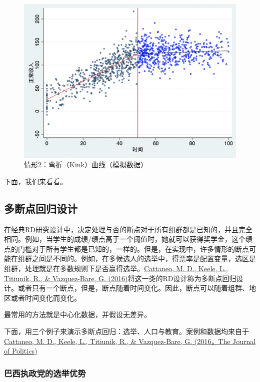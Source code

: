 \documentclass[cn,12pt,math=newtx,citestyle=gb7714-2015,bibstyle=gb7714-2015]{elegantbook}
\begin{document}
		
	    \begin{figure}[tbph]
	    	\centering
	    	\includegraphics[width=1\linewidth]{kink2}
	    	\caption{情形2：弯折（Kink）曲线（模拟数据）}
	    	\label{fig:kink2}
	    \end{figure}
	
	    下面，我们来看看。
	
	\subsection{多断点回归设计}
	
    在经典RD研究设计中，决定处理与否的断点对于所有组群都是已知的，并且完全相同。例如，当学生的成绩/绩点高于一个阈值时，她就可以获得奖学金，这个绩点的门槛对于所有学生都是已知的，一样的。但是，在实现中，许多情形的断点可能在组群之间是不同的。例如，在多候选人的选举中，得票率是配置变量，选区是组群，处理就是在多数规则下是否赢得选举。\href{https://www.journals.uchicago.edu/doi/pdf/10.1086/686802}{Cattaneo, M. D., Keele, L., Titiunik, R., \& Vazquez-Bare, G. (2016)}将这一类的RD设计称为多断点回归设计。或者只有一个断点，但是，断点随着时间变化。因此，断点可以随着组群、地区或者时间变化而变化。
    
    最常用的方法就是中心化数据，并假设无差异。
    
    下面，用三个例子来演示多断点回归：选举、人口与教育。案例和数据均来自于\href{https://www.journals.uchicago.edu/doi/pdf/10.1086/686802}{Cattaneo, M. D., Keele, L., Titiunik, R., \& Vazquez-Bare, G. (2016，The Journal of Politics)}
    
    \subsubsection{巴西执政党的选举优势}
    
\end{document}
